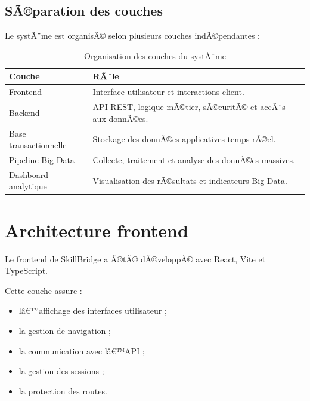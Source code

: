 ﻿\documentclass[12pt,a4paper]{report}
\begin{document}
\subsection{SÃ©paration des couches}

Le systÃ¨me est organisÃ© selon plusieurs couches indÃ©pendantes :

\begin{table}[H]
    \centering
    \caption{Organisation des couches du systÃ¨me}

    \begin{tabular}{|p{4cm}|p{9cm}|}
        \hline
        \textbf{Couche} & \textbf{RÃ´le} \\
        \hline

        Frontend &
        Interface utilisateur et interactions client. \\
        
        \hline

        Backend &
        API REST, logique mÃ©tier, sÃ©curitÃ© et accÃ¨s aux donnÃ©es. \\
        
        \hline

        Base transactionnelle &
        Stockage des donnÃ©es applicatives temps rÃ©el. \\
        
        \hline

        Pipeline Big Data &
        Collecte, traitement et analyse des donnÃ©es massives. \\
        
        \hline

        Dashboard analytique &
        Visualisation des rÃ©sultats et indicateurs Big Data. \\
        
        \hline
    \end{tabular}
\end{table}

\section{Architecture frontend}

Le frontend de SkillBridge a Ã©tÃ© dÃ©veloppÃ© avec React, Vite et TypeScript.

Cette couche assure :
\begin{itemize}
    \item lâ€™affichage des interfaces utilisateur ;
    \item la gestion de navigation ;
    \item la communication avec lâ€™API ;
    \item la gestion des sessions ;
    \item la protection des routes.
\end{itemize}
\end{document}
